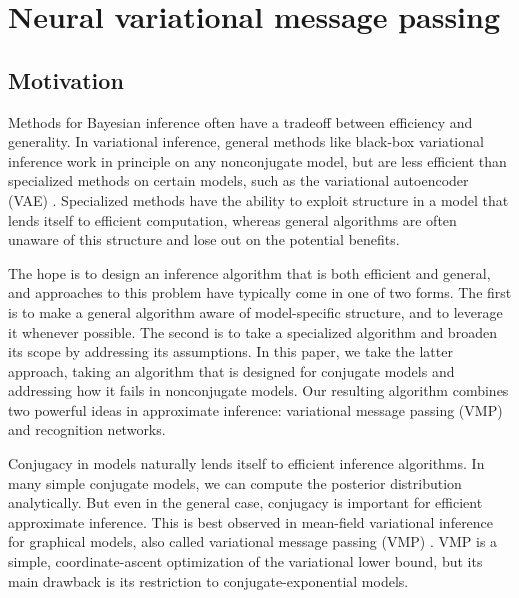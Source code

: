\chapter{Neural variational message passing}

\section{Motivation}
Methods for Bayesian inference
often have a tradeoff between
efficiency and generality.
In variational inference,
general methods like black-box variational inference \cite{bbvi}
work in principle on any nonconjugate model,
but are less efficient
than specialized methods on certain models,
such as the variational autoencoder (VAE) \cite{vae}. 
Specialized
methods have the ability to
exploit structure in a model
that lends itself to efficient computation,
whereas general algorithms are often
unaware of this structure and lose out on the potential 
benefits.

The hope is to design an inference algorithm
that is both efficient and general,
and approaches to this problem have typically come in one of two forms.
The first is to make a general algorithm
aware of model-specific structure,
and to leverage it whenever possible.
The second is to take a specialized
algorithm and broaden its scope
by addressing its assumptions.
In this paper, we take the latter approach,
taking an algorithm
that is designed for conjugate models
and addressing how it fails in nonconjugate models.
Our resulting algorithm combines two powerful ideas 
in approximate inference: variational message
passing (VMP)\cite{vmp} and recognition networks.


Conjugacy in models naturally lends itself
to efficient inference algorithms.
In many simple conjugate models,
we can compute the posterior distribution analytically.
But even in the general case, conjugacy is important
for efficient approximate inference.
This is best observed in mean-field variational inference
for graphical models, also called variational message passing (VMP) \cite{vmp}.
VMP is a simple, coordinate-ascent optimization of the
variational lower bound,
but its main drawback is its restriction
to conjugate-exponential models.

